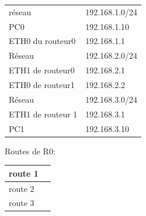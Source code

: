 \documentclass[a4paper]{article}
\begin{document}
\begin{itemize}
\begin{center}
        \begin{tabular}{ll}
            réseau & 192.168.1.0/24 \\
            PC0 & 192.168.1.10 \\
            ETH0 du routeur0 & 192.168.1.1 \\
            Réseau & 192.168.2.0/24 \\
            ETH1 de routeur0 & 192.168.2.1 \\
            ETH0 de routeur1 & 192.168.2.2 \\
            Réseau & 192.168.3.0/24 \\
            ETH1 de routeur 1 & 192.168.3.1 \\
            PC1 & 192.168.3.10
        \end{tabular}
    \end{center}
    Routes de R0:
    \begin{center}
        \begin{tabular}{|l|l|} \hline
            route 1 & \\ \hline
            route 2 & \\ \hline
            route 3 & \\ \hline
        \end{tabular}
    \end{center}
\end{itemize}
\end{document}
